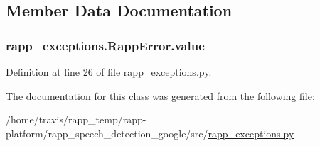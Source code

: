 \subsection{Member Data Documentation}
\hypertarget{classrapp__exceptions_1_1RappError_a4013bcf7e5d7231460c7715a6af02eef}{
\subsubsection[{value}]{\setlength{\rightskip}{0pt plus 5cm}rapp\-\_\-exceptions.\-Rapp\-Error.\-value}}\label{classrapp__exceptions_1_1RappError_a4013bcf7e5d7231460c7715a6af02eef}


Definition at line 26 of file rapp\-\_\-exceptions.\-py.



The documentation for this class was generated from the following file\-:\begin{DoxyCompactItemize}
\item 
/home/travis/rapp\-\_\-temp/rapp-\/platform/rapp\-\_\-speech\-\_\-detection\-\_\-google/src/\hyperlink{rapp__speech__detection__google_2src_2rapp__exceptions_8py}{rapp\-\_\-exceptions.\-py}\end{DoxyCompactItemize}
